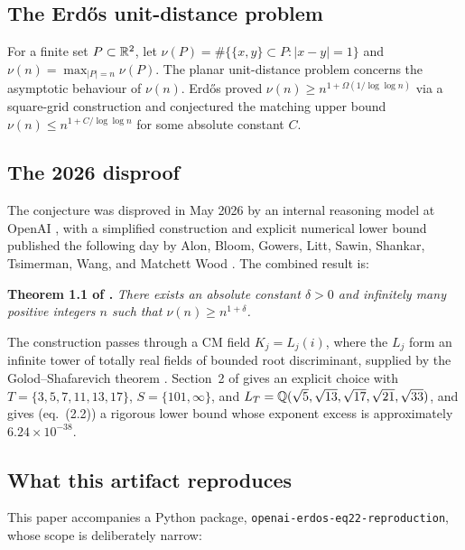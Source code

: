 
\subsection{The Erd\H{o}s unit-distance problem}

For a finite set $P \subset \mathbb{R}^2$, let
$\nu(P) = \#\{\{x, y\} \subset P : |x - y| = 1\}$
and $\nu(n) = \max_{|P| = n} \nu(P)$. The planar unit-distance problem
\cite{Erdos1946} concerns the asymptotic behaviour of $\nu(n)$. Erd\H{o}s
proved $\nu(n) \geq n^{1 + \Omega(1/\log \log n)}$ via a square-grid
construction and conjectured the matching upper bound
$\nu(n) \leq n^{1 + C / \log \log n}$ for some absolute constant $C$.

\subsection{The 2026 disproof}

The conjecture was disproved in May 2026 by an internal reasoning model
at OpenAI \cite{OpenAI2026Proof}, with a simplified construction and
explicit numerical lower bound published the following day by Alon,
Bloom, Gowers, Litt, Sawin, Shankar, Tsimerman, Wang, and Matchett Wood
\cite{Sawin2026Remarks}. The combined result is:

\medskip
\noindent\textbf{Theorem 1.1 of \cite{Sawin2026Remarks}.}
\textit{There exists an absolute constant $\delta > 0$ and infinitely many
positive integers $n$ such that $\nu(n) \geq n^{1 + \delta}$.}

\medskip
The construction passes through a CM field $K_j = L_j(i)$, where the
$L_j$ form an infinite tower of totally real fields of bounded root
discriminant, supplied by the Golod--Shafarevich theorem
\cite{GolodShafarevich1964}. Section~2 of \cite{Sawin2026Remarks}
gives an explicit choice with
$T = \{3, 5, 7, 11, 13, 17\}$, $S = \{101, \infty\}$, and
$L_T = \mathbb{Q}(\sqrt{5}, \sqrt{13}, \sqrt{17}, \sqrt{21}, \sqrt{33})$,
and gives (eq.~(2.2)) a rigorous lower bound whose exponent excess is
approximately $6.24 \times 10^{-38}$.

\subsection{What this artifact reproduces}
\label{sec:scope}

This paper accompanies a Python package,
\texttt{openai-erdos-eq22-reproduction},
whose scope is deliberately narrow:

